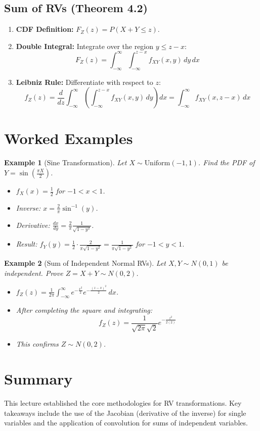 \documentclass[11pt]{article}
\newtheorem{example}{Example}[section]
\begin{document}
\subsection{Sum of RVs (Theorem 4.2)}
\begin{enumerate}
    \item \textbf{CDF Definition:} $F_Z(z) = P(X + Y \le z)$.
    \item \textbf{Double Integral:} Integrate over the region $y \le z - x$:
    \[ F_Z(z) = \int_{-\infty}^{\infty} \int_{-\infty}^{z-x} f_{XY}(x, y) \, dy \, dx \]
    \item \textbf{Leibniz Rule:} Differentiate with respect to $z$:
    \[ f_Z(z) = \frac{d}{dz} \int_{-\infty}^{\infty} \left( \int_{-\infty}^{z-x} f_{XY}(x, y) \, dy \right) dx = \int_{-\infty}^{\infty} f_{XY}(x, z-x) \, dx \]
\end{enumerate}

\section{Worked Examples}

\begin{example}[Sine Transformation]
Let $X \sim \text{Uniform}(-1, 1)$. Find the PDF of $Y = \sin(\frac{\pi X}{2})$.
\begin{itemize}
    \item $f_X(x) = \frac{1}{2}$ for $-1 < x < 1$.
    \item Inverse: $x = \frac{2}{\pi} \sin^{-1}(y)$.
    \item Derivative: $\frac{dx}{dy} = \frac{2}{\pi} \frac{1}{\sqrt{1-y^2}}$.
    \item Result: $f_Y(y) = \frac{1}{2} \cdot \frac{2}{\pi \sqrt{1-y^2}} = \frac{1}{\pi\sqrt{1-y^2}}$ for $-1 < y < 1$.
\end{itemize}
\end{example}

\begin{example}[Sum of Independent Normal RVs]
Let $X, Y \sim N(0, 1)$ be independent. Prove $Z = X + Y \sim N(0, 2)$.
\begin{itemize}
    \item $f_Z(z) = \frac{1}{2\pi} \int_{-\infty}^{\infty} e^{-\frac{x^2}{2}} e^{-\frac{(z-x)^2}{2}} \, dx$.
    \item After completing the square and integrating:
    \[ f_Z(z) = \frac{1}{\sqrt{2\pi}\sqrt{2}} e^{-\frac{z^2}{2(2)}} \]
    \item This confirms $Z \sim N(0, 2)$.
\end{itemize}
\end{example}

\section{Summary}
This lecture established the core methodologies for RV transformations. Key takeaways include the use of the Jacobian (derivative of the inverse) for single variables and the application of convolution for sums of independent variables.
\end{document}
